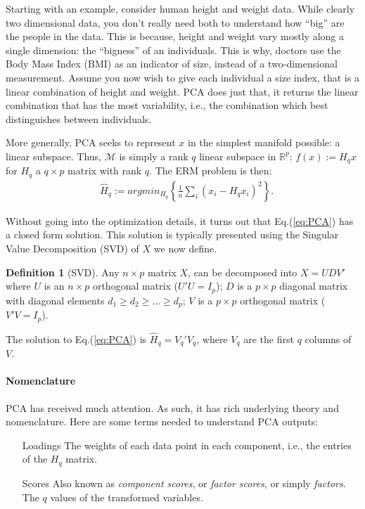 \documentclass[12pt,a4paper]{article}
\theoremstyle{plain}
\theoremstyle{definition}
\newtheorem{definition}{Definition}
\newcommand{\argmin}[2]{argmin_{#1}\left\{ #2 \right\}}
\newcommand{\hyp}{f}
\newcommand{\manifold}{\mathcal{M}}
\newcommand{\projectMat}{H}
\newcommand{\rank}{q}
\begin{document}
Starting with an example, consider human height and weight data. 
While clearly two dimensional data, you don't really need both to understand how ``big'' are the people in the data. 
This is because, height and weight vary mostly along a single dimension: the ``bigness'' of an individuals. 
This is why, doctors use the Body Mass Index (BMI) as an indicator of size, instead of a two-dimensional measurement.
Assume you now wish to give each individual a size index, that is a linear combination of height and weight. PCA does just that, it returns the linear combination that has the most variability, i.e., the combination which best distinguishes between individuals. 

More generally, PCA seeks to represent $x$ in the simplest manifold possible: a linear subspace. Thus, $\manifold$ is simply a rank $\rank$ linear subspace in $\mathbb{R}^p$: $\hyp(x):=\projectMat_\rank x$ for $\projectMat_\rank$ a $\rank \times p$ matrix with rank $\rank$.
The ERM problem is then:
\begin{align}
\label{eq:PCA}
	& \hat{\projectMat}_\rank:= \argmin{\projectMat_\rank}{\frac{1}{n}\sum_i (x_i-\projectMat_\rank x_i)^2} .
\end{align}

Without going into the optimization details, it turns out that Eq.(\ref{eq:PCA}) has a closed form solution. 
This solution is typically presented using the Singular Value Decomposition (SVD) of $X$ we now define.
\begin{definition}[SVD]
Any $n \times p$ matrix $X$, can be decomposed into $X=UDV'$ where 
$U$ is an $n \times p$ orthogonal matrix ($U'U=I_p$); 
$D$ is a $p \times p$ diagonal matrix with diagonal elements $d_1 \geq d_2 \geq \dots \geq d_p$;
$V$ is a $p \times p$ orthogonal matrix ($V'V=I_p$).
\end{definition}

The solution to Eq.(\ref{eq:PCA}) is $\hat{\projectMat}_\rank=V_\rank'V_\rank$, where $V_\rank$ are the first $\rank$ columns of $V$.


\paragraph{Nomenclature}
PCA has received much attention. As such, it has rich underlying theory and nomenclature.
Here are some terms needed to understand PCA outputs:
\begin{itemize}
\item[Loadings] The weights of each data point in each component, i.e., the entries of the $\projectMat_\rank$ matrix.
\item[Scores] Also known as \emph{component scores}, or \emph{factor scores}, or simply \emph{factors}. The $\rank$ values of the transformed variables.
\end{itemize}
\end{document}
